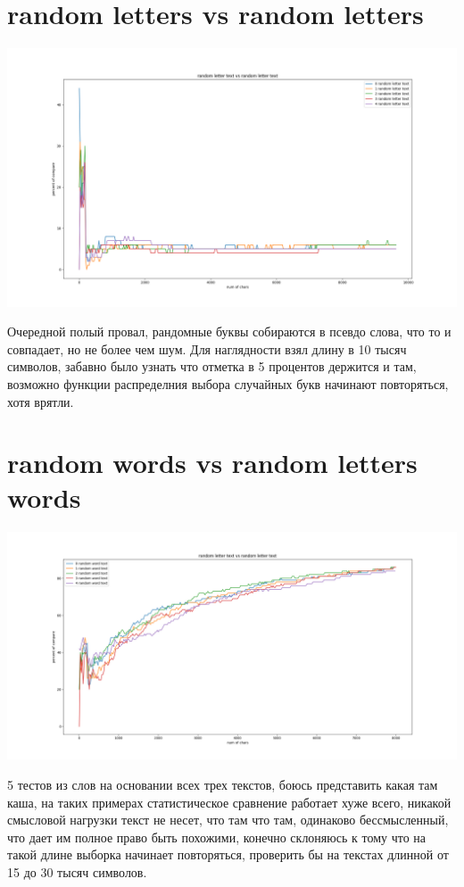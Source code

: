 \section{random letters vs random letters}
\includegraphics[scale=0.4]{pic/4.png}

Очередной полый провал, рандомные буквы собираются в псевдо слова, что то и совпадает, но не более чем шум. Для наглядности взял длину в 10 тысяч символов, забавно было узнать что отметка в 5 процентов держится и там, возможно функции распределния выбора случайных букв начинают повторяться, хотя врятли.


\section{random words vs random letters words}
\includegraphics[scale=0.4]{pic/5.png}

5 тестов из слов на основании всех трех текстов, боюсь представить какая там каша, на таких примерах статистическое сравнение работает хуже всего, никакой смысловой нагрузки текст не несет, что там что там, одинаково бессмысленный, что дает им полное право быть похожими, конечно склоняюсь к тому что на такой длине выборка начинает повторяться, проверить бы на текстах длинной от 15 до 30 тысяч символов.

